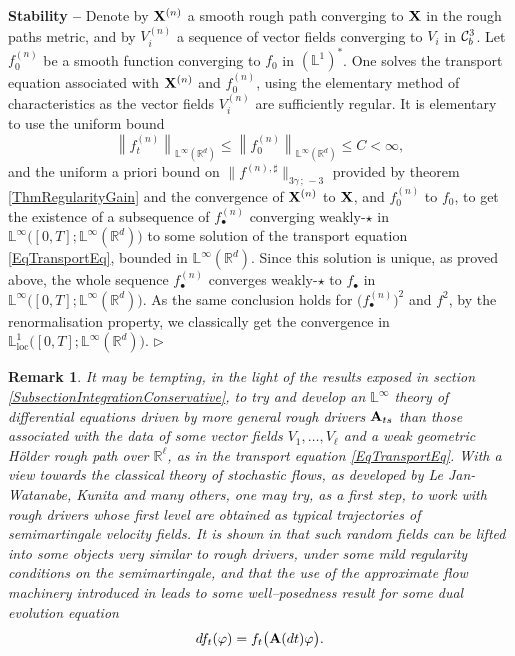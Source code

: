 \documentclass[11pt,a4paper]{amsart}
\newcommand{\RR}{\mathbb{R}}  \newcommand{\CC}{\mathbb{C}}  \newcommand{\LL}{\mathbb{L}}  \newcommand{\WW}{\mathbb{W}}
\renewcommand{\leq}{\leqslant}
\newtheorem{rem}[thm]{{\sc Remark}}
\numberwithin{equation}{section} %
\newenvironment{Dem}{%
    \begin{list}{\hspace{0.5cm}{\sc Proof --}}{%
        \setlength{\topsep}{0pt}%
        \setlength{\leftmargin}{0pt}%
        \setlength{\rightmargin}{0pt}%
        \setlength{\listparindent}{0pt}%
        \setlength{\itemindent}{0pt}%
        \setlength{\parsep}{0pt}%
        \addtolength{\leftmargin}{20pt}%
        \addtolength{\rightmargin}{0pt}%
    } \item }{\hfill{\space $\rhd$}\end{list}\smallskip}
\begin{document}
\begin{Dem}
{\bf Stability --} Denote by ${{\bf X}}^{(n)}$ a smooth rough path converging to ${\bf X}$ in the rough paths metric, and by $V^{(n)}_i$ a sequence of vector fields converging to $V_i$ in $\mathcal{C}^3_b$. Let $f^{(n)}_0$ be a smooth function converging to $f_0$ in $(\LL^1)^*$. One solves the transport equation associated with ${{\bf X}}^{(n)}$ and $f^{(n)}_0$, using the elementary method of characteristics as the vector fields $V^{(n)}_i$ are sufficiently regular. It is elementary to use the uniform bound
$$
\left\|f^{(n)}_t\right\|_{\LL^\infty(\RR^d)} \leq \left\|f^{(n)}_0\right\|_{\LL^\infty(\RR^d)} \leq C<\infty,
$$ 
and the uniform a priori bound on $\big\|f^{(n),\sharp}\big\|_{3\gamma\,;\,-3}$ provided by theorem \ref{ThmRegularityGain} and the convergence of ${{\bf X}}^{(n)}$ to ${\bf X}$, and $f^{(n)}_0$ to $f_0$, to get the existence of a subsequence of $f^{(n)}_\bullet$ converging weakly-$\star$ in $\LL^\infty\big([0,T];\LL^\infty(\RR^d)\big)$ to some solution of the transport equation \eqref{EqTransportEq}, bounded in $\LL^\infty(\RR^d)$. Since this solution is unique, as proved above, the whole sequence $f^{(n)}_\bullet$ converges weakly-$\star$ to $f_\bullet$ in $\LL^\infty\big([0,T];\LL^\infty(\RR^d)\big)$. As the same conclusion holds for $\Big(f^{(n)}_\bullet\Big)^2$ and $f^2$, by the renormalisation property, we classically get the convergence in $\LL^1_\textrm{loc}\big([0,T];\LL^\infty(\RR^d)\big)$.
\end{Dem}

\bigskip

\begin{rem}
It may be tempting, in the light of the results exposed in section \ref{SubsectionIntegrationConservative}, to try and develop an $\LL^\infty$ theory of differential equations driven by more general rough drivers ${\bf A}_{ts}$ than those associated with the data of some vector fields $V_1,\dots, V_\ell$ and a weak geometric H\"older rough path over $\RR^\ell$, as in the transport equation \eqref{EqTransportEq}. With a view towards the classical theory of stochastic flows, as developed by Le Jan-Watanabe, Kunita and many others, one may try, as a first step, to work with rough drivers whose first level are obtained as typical trajectories of semimartingale velocity fields. It is shown in \cite{BailleulRiedel} that such random fields can be lifted into some objects very similar to rough drivers, under some mild regularity conditions on the semimartingale, and that the use of the approximate flow machinery introduced in \cite{BailleulRMI} leads to some well--posedness result for some dual evolution equation 
$$
df_t(\varphi) = f_t\big({\bf A}(dt)\varphi\big) .   
$$ 
\end{rem}
\end{document}
